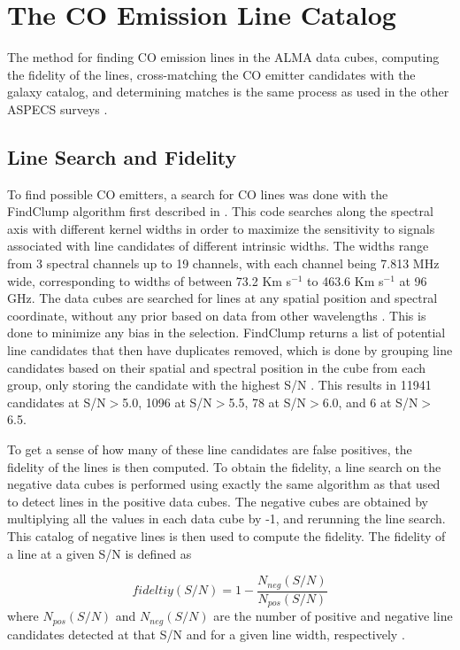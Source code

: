 \section{The CO Emission Line Catalog}

The method for finding CO emission lines in the ALMA data cubes, computing the fidelity of the lines, cross-matching the CO emitter candidates with the galaxy catalog, and determining matches is the same process as used in the other ASPECS surveys \cite{walter2016alma, decarli2019alma, gonzalez2019alma}.

\subsection{Line Search and Fidelity}

To find possible CO emitters, a search for CO lines was done with the FindClump algorithm first described in \cite{walter2016alma}. This code searches along the spectral axis with different kernel widths in order to maximize the sensitivity to signals associated with line candidates of different intrinsic widths. The widths range from 3 spectral channels up to 19 channels, with each channel being 7.813 MHz wide, corresponding to widths of between 73.2 Km s$^{-1}$ to 463.6 Km s$^{-1}$ at 96 GHz. The data cubes are searched for lines at any spatial position and spectral coordinate, without any prior based on data from other wavelengths \cite{walter2016alma}. This is done to minimize any bias in the selection. FindClump returns a list of potential line candidates that then have duplicates removed, which is done by grouping line candidates based on their spatial and spectral position in the cube from each group, only storing the candidate with the highest S/N \cite{walter2016alma}. This results in 11941 candidates at S/N$>$5.0, 1096 at S/N$>$5.5, 78 at S/N$>$6.0, and 6 at S/N$>$6.5. 

To get a sense of how many of these line candidates are false positives, the fidelity of the lines is then computed. To obtain the fidelity, a line search on the negative data cubes is performed using exactly the same algorithm as that used to detect lines in the positive data cubes. The negative cubes are obtained by multiplying all the values in each data cube by -1, and rerunning the line search. This catalog of negative lines is then used to compute the fidelity. The fidelity of a line at a given S/N is defined as 

$$ fideltiy(S/N) = 1 - \frac{N_{neg}(S/N)}{N_{pos}(S/N)} $$ where $N_{pos}(S/N)$ and $N_{neg}(S/N)$ are the number of positive and negative line candidates detected at that S/N and for a given line width, respectively \cite{gonzalez2019alma}.

